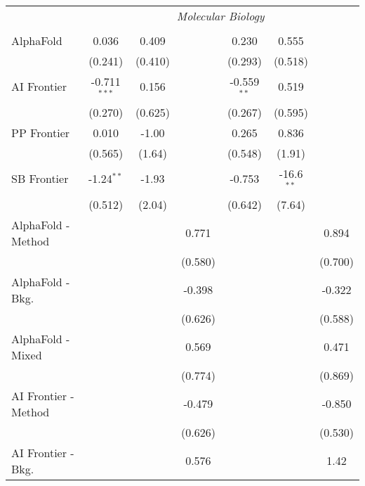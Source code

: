 \begin{tabular}{lcccccc}
 & \multicolumn{6}{c}{\textit{Molecular Biology}} \\ \\
   AlphaFold            & 0.036          & 0.409   &               & 0.230         & 0.555        &   \\   
                        & (0.241)        & (0.410) &               & (0.293)       & (0.518)      &   \\   
   AI Frontier          & -0.711$^{***}$ & 0.156   &               & -0.559$^{**}$ & 0.519        &   \\   
                        & (0.270)        & (0.625) &               & (0.267)       & (0.595)      &   \\   
   PP Frontier          & 0.010          & -1.00   &               & 0.265         & 0.836        &   \\   
                        & (0.565)        & (1.64)  &               & (0.548)       & (1.91)       &   \\   
   SB Frontier          & -1.24$^{**}$   & -1.93   &               & -0.753        & -16.6$^{**}$ &   \\   
                        & (0.512)        & (2.04)  &               & (0.642)       & (7.64)       &   \\   
   AlphaFold - Method   &                &         & 0.771         &               &              & 0.894\\   
                        &                &         & (0.580)       &               &              & (0.700)\\   
   AlphaFold - Bkg.     &                &         & -0.398        &               &              & -0.322\\   
                        &                &         & (0.626)       &               &              & (0.588)\\   
   AlphaFold - Mixed    &                &         & 0.569         &               &              & 0.471\\   
                        &                &         & (0.774)       &               &              & (0.869)\\   
   AI Frontier - Method &                &         & -0.479        &               &              & -0.850\\   
                        &                &         & (0.626)       &               &              & (0.530)\\   
   AI Frontier - Bkg.   &                &         & 0.576         &               &              & 1.42\\   

\end{tabular}
